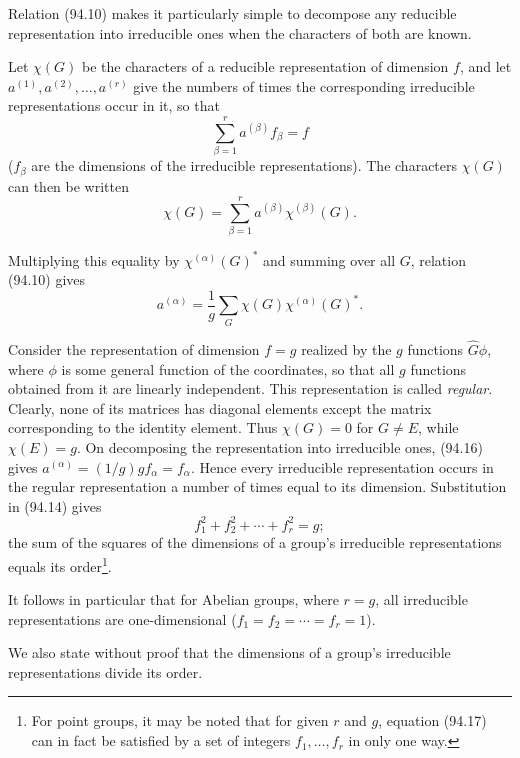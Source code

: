 Relation (94.10) makes it particularly simple to decompose any reducible representation into irreducible ones when the characters of both are known.

Let $\chi(G)$ be the characters of a reducible representation of dimension $f$, and let $a^{(1)},a^{(2)},\ldots,a^{(r)}$ give the numbers of times the corresponding irreducible representations occur in it, so that
\begin{equation}
 \sum_{\beta=1}^ra^{(\beta)}f_\beta=f
 \tag{94.14}
\end{equation}
($f_\beta$ are the dimensions of the irreducible representations). The characters $\chi(G)$ can then be written
\begin{equation}
 \chi(G)=\sum_{\beta=1}^ra^{(\beta)}\chi^{(\beta)}(G).
 \tag{94.15}
\end{equation}

Multiplying this equality by $\chi^{(\alpha)}(G)^*$ and summing over all $G$, relation (94.10) gives
\begin{equation}
 a^{(\alpha)}=\frac1g\sum_G\chi(G)\chi^{(\alpha)}(G)^*.
 \tag{94.16}
\end{equation}

Consider the representation of dimension $f=g$ realized by the $g$ functions $\widehat G\phi$, where $\phi$ is some general function of the coordinates, so that all $g$ functions obtained from it are linearly independent. This representation is called \emph{regular}. Clearly, none of its matrices has diagonal elements except the matrix corresponding to the identity element. Thus $\chi(G)=0$ for $G\ne E$, while $\chi(E)=g$. On decomposing the representation into irreducible ones, (94.16) gives $a^{(\alpha)}=(1/g)gf_\alpha=f_\alpha$. Hence every irreducible representation occurs in the regular representation a number of times equal to its dimension. Substitution in (94.14) gives
\begin{equation}
 f_1^2+f_2^2+\cdots+f_r^2=g;
 \tag{94.17}
\end{equation}
the sum of the squares of the dimensions of a group's irreducible representations equals its order\footnote{For point groups, it may be noted that for given $r$ and $g$, equation (94.17) can in fact be satisfied by a set of integers $f_1,\ldots,f_r$ in only one way.}.

It follows in particular that for Abelian groups, where $r=g$, all irreducible representations are one-dimensional ($f_1=f_2=\cdots=f_r=1$).

We also state without proof that the dimensions of a group's irreducible representations divide its order.

